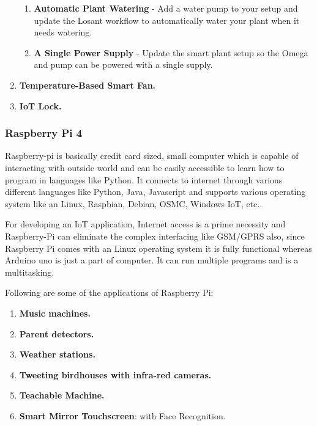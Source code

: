\documentclass[a4paper,11pt]{article}
\begin{document}
\begin{iotsolution}
\begin{enumerate}
\begin{enumerate}
    \item \textbf{Automatic Plant Watering} - Add a water pump to your setup and update the Losant workflow to automatically water your plant when it needs watering.
    
    \item \textbf{A Single Power Supply} - Update the smart plant setup so the Omega and pump can be powered with a single supply.
\end{enumerate}

\item \textbf{Temperature-Based Smart Fan.}

\item \textbf{IoT Lock.}
\end{enumerate}

\subsubsection*{Raspberry Pi 4}
Raspberry-pi is basically credit card sized, small computer which is capable of interacting with outside world and can be easily accessible to learn how to program in languages like Python. It connects to internet through various different languages like Python, Java, Javascript and supports various operating system like an Linux, Raspbian, Debian, OSMC, Windows IoT, etc.\cite{[A3]}.

For developing an IoT application, Internet access is a prime necessity and Raspberry-Pi can eliminate the complex interfacing like GSM/GPRS also, since Raspberry Pi comes with an Linux operating system it is fully functional whereas Arduino uno is just a part of computer. It can run multiple programs and is a multitasking\cite{[A4]}\cite{[A5]}.

Following are some of the applications of Raspberry Pi\cite{[A2]}:
\begin{enumerate}
\item \textbf{Music machines.}

\item \textbf{Parent detectors.}

\item \textbf{Weather stations.}

\item \textbf{Tweeting birdhouses with infra-red cameras.}

\item \textbf{Teachable Machine.}

\item \textbf{Smart Mirror Touchscreen}: with Face Recognition.


\end{enumerate}
\end{iotsolution}
\end{document}
